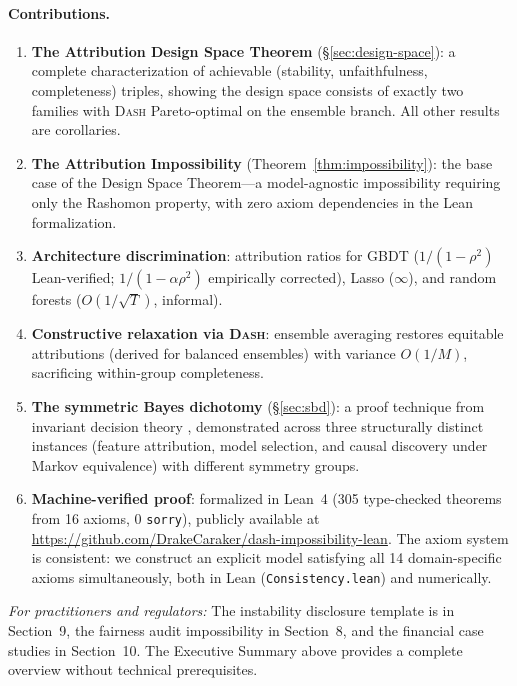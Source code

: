 \documentclass{article}
\newcommand{\DASH}{\textsc{Dash}}
\newcommand{\GBDT}{\textsc{GBDT}}
\begin{document}
\paragraph{Contributions.}
\begin{sloppypar}
\begin{enumerate}
    \item \textbf{The Attribution Design Space Theorem} (\S\ref{sec:design-space}):
    a complete characterization of achievable (stability, unfaithfulness, completeness)
    triples, showing the design space consists of exactly two families with \DASH{}
    Pareto-optimal on the ensemble branch. All other results are corollaries.
    \item \textbf{The Attribution Impossibility} (Theorem~\ref{thm:impossibility}):
    the base case of the Design Space Theorem---a model-agnostic impossibility
    requiring only the Rashomon property, with zero axiom dependencies in the Lean
    formalization.
    \item \textbf{Architecture discrimination}: attribution ratios for \GBDT{}
    ($1/(1{-}\rho^2)$ Lean-verified; $1/(1{-}\alpha\rho^2)$ empirically corrected),
    Lasso ($\infty$), and random forests ($O(1/\sqrt{T})$, informal).
    \item \textbf{Constructive relaxation via \DASH{}}: ensemble averaging restores
    equitable attributions (derived for balanced ensembles) with variance $O(1/M)$,
    sacrificing within-group completeness.
    \item \textbf{The symmetric Bayes dichotomy} (\S\ref{sec:sbd}): a proof technique
    from invariant decision theory \citep{lehmann2005testing}, demonstrated across three
    structurally distinct instances (feature attribution, model selection, and causal
    discovery under Markov equivalence) with different symmetry groups.
    \item \textbf{Machine-verified proof}: formalized in Lean~4 (305 type-checked theorems from 16 axioms, 0 \texttt{sorry}), publicly available at \url{https://github.com/DrakeCaraker/dash-impossibility-lean}. The axiom system is consistent: we construct an explicit model satisfying all 14 domain-specific axioms simultaneously, both in Lean (\texttt{Consistency.lean}) and numerically.
\end{enumerate}
\end{sloppypar}

\noindent\textit{For practitioners and regulators:} The instability disclosure template is in Section~9, the fairness audit impossibility in Section~8, and the financial case studies in Section~10. The Executive Summary above provides a complete overview without technical prerequisites.
\end{document}
